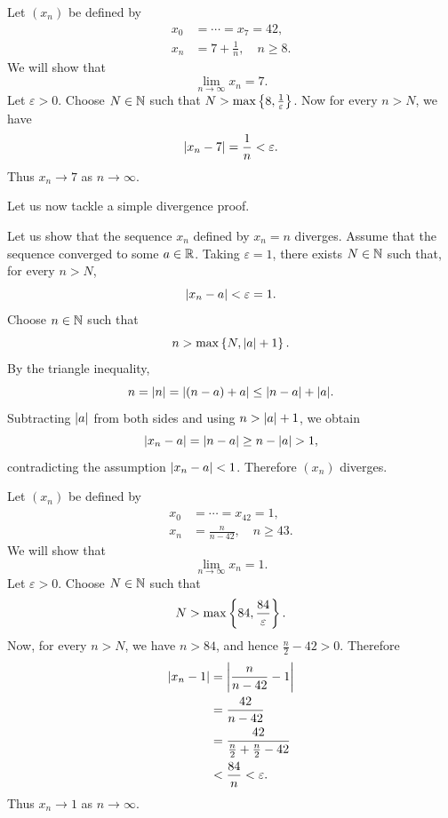 \documentclass[11pt,a4paper]{amsart}
\begin{document}
\begin{example}
  Let \((x_n)\) be defined by
  \[
    \begin{aligned}
      x_0 &= \cdots = x_7 = 42, \\
      x_n &= 7 + \frac{1}{n}, \quad n \geq 8.
    \end{aligned}
  \]
  We will show that
  \[
    \lim_{n \to \infty} x_n = 7.
  \]
  Let \(\varepsilon > 0\). Choose \(N \in \NN\) such that
  \(N > \maxset{8, \frac{1}{\varepsilon}}\). Now for every \(n > N\), we have
  \[
    \abs{x_n - 7} = \frac{1}{n} < \varepsilon.
  \]
  Thus \(x_n \to 7\) as \(n \to \infty\).
\end{example}

Let us now tackle a simple divergence proof.

\begin{example}
  Let us show that the sequence \(x_n\) defined by \(x_n = n\) diverges.
  Assume that the sequence converged to some \(a \in \RR\).
  Taking \(\varepsilon = 1\), there exists \(N \in \NN\) such that,
  for every \(n > N\),
  \[
    \abs{x_n - a} < \varepsilon = 1.
  \]
  Choose \(n \in \NN\) such that
  \[
    n > \maxset{N, \abs{a} + 1}.
  \]
  By the triangle inequality,
  \[
    n=\abs{n}=\abs{(n-a)+a}\leq\abs{n-a}+\abs{a}.
  \]
  Subtracting \(\abs{a}\) from both sides and using
  \(n>\abs{a}+1\), we obtain
  \[
    \abs{x_n-a}=\abs{n-a}\geq n-\abs{a}>1,
  \]
  contradicting the assumption \(\abs{x_n - a} < 1\). Therefore
  \((x_n)\) diverges.
\end{example}

\begin{example}
  Let \((x_n)\) be defined by
  \[
    \begin{aligned}
      x_0 &= \cdots = x_{42} = 1, \\
      x_n &= \frac{n}{n - 42}, \quad n \geq 43.
    \end{aligned}
  \]
  We will show that
  \[
    \lim_{n \to \infty} x_n = 1.
  \]
  Let \(\varepsilon > 0\). Choose \(N \in \NN\) such that
  \[
    N > \maxset{84, \frac{84}{\varepsilon}}.
  \]
  Now, for every \(n>N\), we have \(n>84\), and hence
  \(\frac{n}{2}-42>0\). Therefore
  \[
    \begin{aligned}
      \abs{x_n - 1} &= \abs*{\frac{n}{n - 42} - 1} \\
      &= \frac{42}{n - 42} \\
      &= \frac{42}{\frac{n}{2} + \frac{n}{2} - 42} \\
      &< \frac{84}{n} < \varepsilon.
    \end{aligned}
  \]
  Thus \(x_n \to 1\) as \(n \to \infty\).
\end{example}
\end{document}
